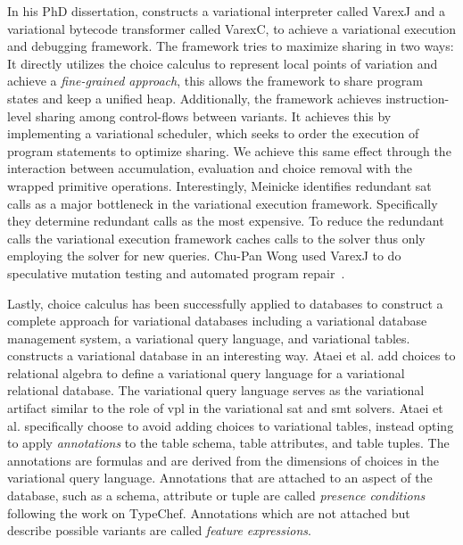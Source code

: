 In his PhD dissertation, \citet{M14,JensDebugging} constructs a variational
interpreter called VarexJ and a variational bytecode transformer called VarexC,
to achieve a variational execution and debugging framework. The framework tries
to maximize sharing in two ways: It directly utilizes the choice calculus to
represent local points of variation and achieve a \emph{fine-grained approach},
this allows the framework to share program states and keep a unified heap.
Additionally, the framework achieves instruction-level sharing among
control-flows between variants. It achieves this by implementing a variational
scheduler, which seeks to order the execution of program statements to optimize
sharing. We achieve this same effect through the interaction between
accumulation, evaluation and choice removal with the wrapped primitive
operations. Interestingly, Meinicke identifies redundant \ac{sat} calls as a
major bottleneck in the variational execution framework. Specifically they
determine redundant  calls as the most expensive. To reduce the
redundant calls the variational execution framework caches calls to the solver
thus only employing the solver for new queries. Chu-Pan Wong used VarexJ to do
speculative mutation testing and automated program repair~\cite{ChuPanThesis}.


Lastly, choice calculus has been successfully applied to databases to construct
a complete approach for variational databases including a variational database
management system, a variational query language, and variational tables.
\citet{ATW17dbpl,ATW18poly} constructs a variational database in an interesting
way. Ataei et al. add choices to relational algebra to define a variational
query language for a variational relational database. The variational query
language serves as the variational artifact similar to the role of \ac{vpl} in
the variational \ac{sat} and \ac{smt} solvers. Ataei et al. specifically choose
to avoid adding choices to variational tables, instead opting to apply
\emph{annotations} to the table schema, table attributes, and table tuples. The
annotations are \pl{} formulas and are derived from the dimensions of choices in
the variational query language. Annotations that are attached to an aspect of
the database, such as a schema, attribute or tuple are called \emph{presence
  conditions} following the work on TypeChef. Annotations which are not attached
but describe possible variants are called \emph{feature expressions}.


